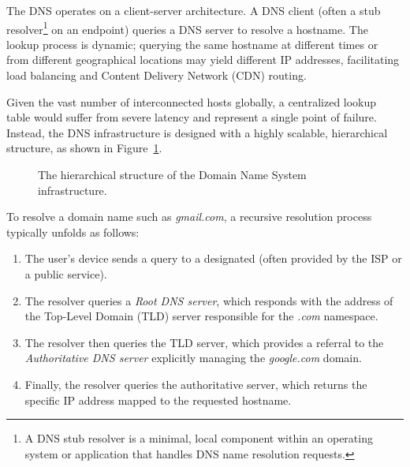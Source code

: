 The DNS operates on a client-server architecture. A DNS client (often a stub resolver\footnote{A DNS stub resolver is a minimal, local component within an operating system or application that handles DNS name resolution requests.} on an endpoint) queries a DNS server to resolve a hostname. The lookup process is dynamic; querying the same hostname at different times or from different geographical locations may yield different IP addresses, facilitating load balancing and Content Delivery Network (CDN) routing.

Given the vast number of interconnected hosts globally, a centralized lookup table would suffer from severe latency and represent a single point of failure. Instead, the DNS infrastructure is designed with a highly scalable, hierarchical structure, as shown in Figure~\ref{fig:dns_tree}.

\begin{figure}[htbp]
    \centering
    \caption{The hierarchical structure of the Domain Name System infrastructure.}
    \label{fig:dns_tree}
\end{figure}

To resolve a domain name such as \emph{gmail.com}, a recursive resolution process typically unfolds as follows:
\begin{enumerate}
    \item The user's device sends a query to a designated  (often provided by the ISP or a public service).
    \item The resolver queries a \emph{Root DNS server}, which responds with the address of the Top-Level Domain (TLD) server responsible for the \emph{.com} namespace.
    \item The resolver then queries the TLD server, which provides a referral to the \emph{Authoritative DNS server} explicitly managing the \emph{google.com} domain.
    \item Finally, the resolver queries the authoritative server, which returns the specific IP address mapped to the requested hostname.
\end{enumerate}

